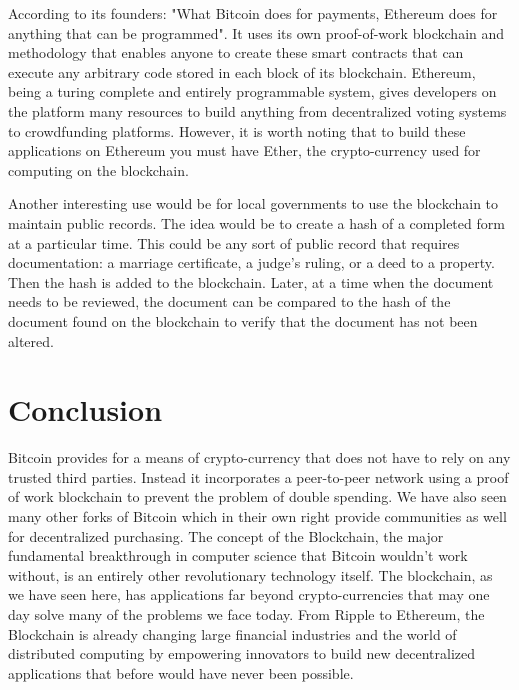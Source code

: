 \documentclass{article}
\begin{document}
	According to its founders: "What Bitcoin does for payments, Ethereum does for anything that can be programmed". It uses its own proof-of-work blockchain and methodology that enables anyone to create these smart contracts that can execute any arbitrary code stored in each block of its blockchain. Ethereum, being a turing complete and entirely programmable system, gives developers on the platform many resources to build anything from decentralized voting systems to crowdfunding platforms. However, it is worth noting that to build these applications on Ethereum you must have Ether, the crypto-currency used for computing on the blockchain.
	
	Another interesting use would be for local governments to use the blockchain to maintain public records. The idea would be to create a hash of a completed form at a particular time. This could be any sort of public record that requires documentation: a marriage certificate, a judge's ruling, or a deed to a property. Then the hash is added to the blockchain. Later, at a time when the document needs to be reviewed, the document can be compared to the hash of the document found on the blockchain to verify that the document has not been altered.




\section{Conclusion}

	Bitcoin provides for a means of crypto-currency that does not have to rely on any trusted third parties. Instead it incorporates a peer-to-peer network using a proof of work blockchain to prevent the problem of double spending. We have also seen many other forks of Bitcoin which in their own right provide communities as well for decentralized purchasing. The concept of the Blockchain, the major fundamental breakthrough in computer science that Bitcoin wouldn't work without, is an entirely other revolutionary technology itself. The blockchain, as we have seen here, has applications far beyond crypto-currencies that may one day solve many of the problems we face today. From Ripple to Ethereum, the Blockchain is already changing large financial industries and the world of distributed computing by empowering innovators to build new decentralized applications that before would have never been possible.

\end{document}
